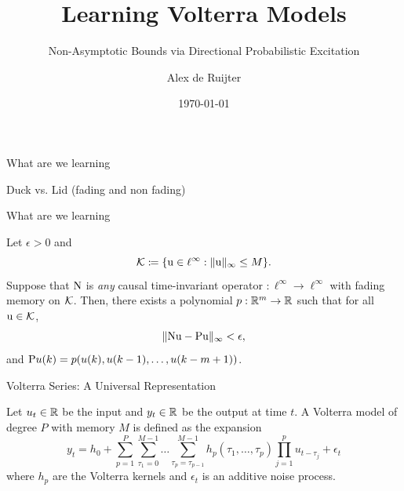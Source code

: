 \documentclass[aspectratio=169, notheorems, 10pt]{beamer}
\title[Learning Volterra Models]{Learning Volterra Models}
\subtitle{Non-Asymptotic Bounds via Directional Probabilistic Excitation}
\institute[Delft]{Delft University of Technology}
\date{\today}
\author[A.L. de Ruijter]{Alex de Ruijter}
\newcommand{\coloneqq}{: \mathrel {\mkern -1.2mu}=}
\begin{document}
\begin{frame}
    \titlepage
\end{frame}

\begin{frame}{What are we learning}
   
    Duck vs. Lid (fading and non fading)

\end{frame}

\begin{frame}{What are we learning}
    \begin{theorem}
    \label{thm:volterra_universal_approximation}
    Let $\epsilon >0$ and 
    \begin{equation}
        \Kcal \coloneqq \{ \vc{u} \in \ell^\infty : \norm{\vc{u}}_{\infty} \leq M \}.
    \end{equation}
    Suppose that ${ \mathrm{N} }$ is \emph{any} causal time-invariant operator $: \ell^\infty \to \ell^\infty$ with fading memory on ${\mathcal{K}}$.
    Then, there exists a polynomial $p: {\mathbb{R}}^m \to {\mathbb{R}}$ such that for all ${ \mathrm{u} } \in {\mathcal{K}}$,
    \begin{equation}
        \|{ \mathrm{N} }{ \mathrm{u} } - { \mathrm{P} }{ \mathrm{u} }\|_\infty < \epsilon,
    \end{equation}
    and ${ \mathrm{P} }u(k) = p(u(k), u(k-1), \dots, u(k-m+1))$.
\end{theorem}
\end{frame}

\begin{frame}{Volterra Series: A Universal Representation}
    \begin{definition}
    \label{def:volterra}
    Let $u_t \in {\mathbb{R}}$ be the input and $y_t \in {\mathbb{R}}$ be the output at time $t$.
    A Volterra model of degree $P$ with memory $M$ is defined as the expansion
    \begin{equation}
        y_t = h_0 + \sum_{p=1}^P \sum_{\tau_1=0}^{M-1} \dots \sum_{\tau_p=\tau_{p-1}}^{M-1} h_p(\tau_1, \dots, \tau_p) \prod_{j=1}^p u_{t-\tau_j} + \epsilon_t
    \end{equation}
    where $h_p$ are the Volterra kernels and $\epsilon_t$ is an additive noise process.
\end{definition}
\end{frame}
\end{document}
